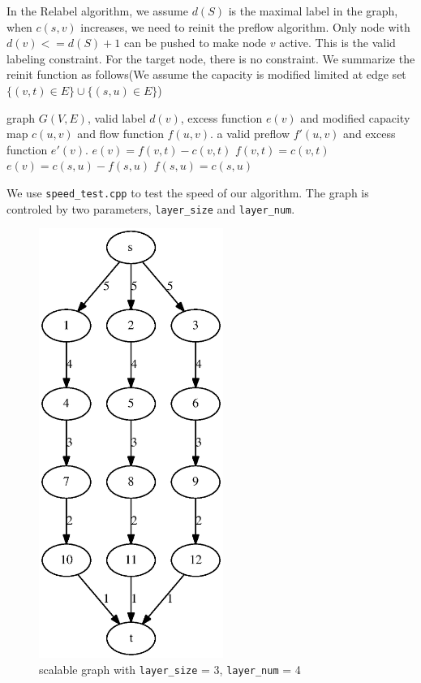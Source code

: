 \documentclass{article}
\begin{document}
In the Relabel algorithm, we assume $d(S) $ is the maximal label in the graph, when $c(s,v)$ increases, we need to reinit the preflow algorithm. Only node with $d(v) <= d(S) + 1$ can be pushed to make node $v$ active. This is the valid labeling constraint. For the target node, there is no constraint. We summarize the reinit function as follows(We assume the capacity is modified limited at edge set $\{(v,t)\in E\}\cup \{(s,u)\in E\}$)
\begin{algorithmic}[1]
\REQUIRE graph $G(V,E)$, valid label $d(v)$, excess function $e(v)$ and modified capacity map $c(u,v)$ and flow function $f(u,v)$.
\ENSURE a valid preflow $f'(u,v)$ and excess function $e'(v)$.
\STATE $e(v) = f(v,t)-c(v,t)$
\STATE $f(v,t)=c(v,t)$
\ENDIF
\ENDFOR
{}
\STATE $e(v) = c(s,u)-f(s,u)$
\STATE $f(s,u)=c(s,u)$
\ENDIF
\ENDFOR
\end{algorithmic}
We use \texttt{speed\_test.cpp} to test the speed of our algorithm. The graph is controled by two parameters,
\texttt{layer\_size} and \texttt{layer\_num}.
\begin{figure}[!ht]
\centering
\includegraphics[width=6cm]{fig/normal.eps}
\caption{scalable graph with \texttt{layer\_size} = 3, \texttt{layer\_num} = 4}\label{fig:normal}
\end{figure}
\end{document}
